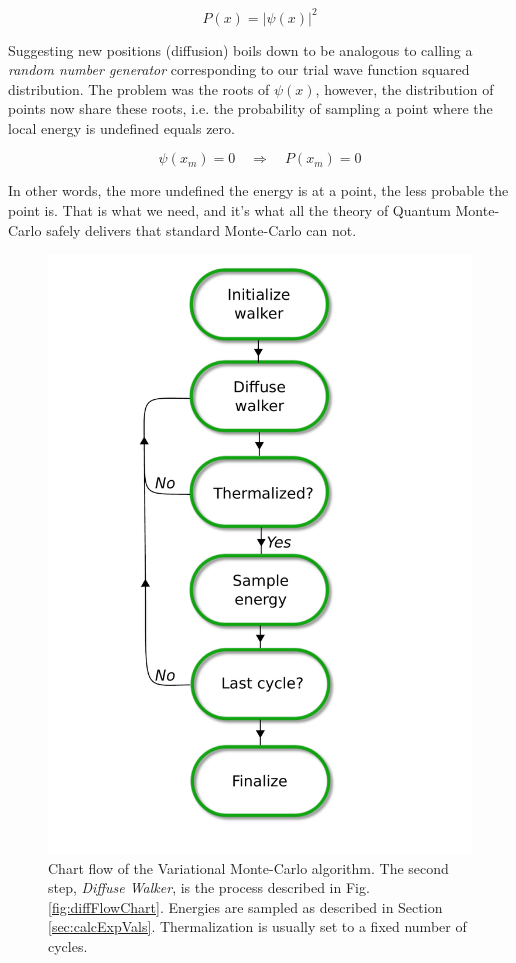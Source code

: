 \begin{equation*}
 P(x) = |\psi(x)|^2
\end{equation*}


Suggesting new positions (diffusion) boils down to be analogous to calling a \textit{random number generator} corresponding to our trial wave function squared distribution. The problem was the roots of $\psi(x)$, however, the distribution of points now share these roots, i.e. the probability of sampling a point where the local energy is undefined equals zero. 

\begin{equation}
 \psi(x_m) = 0 \quad\Longrightarrow\quad P(x_m) = 0
\end{equation}

In other words, the more undefined the energy is at a point, the less probable the point is. That is what we need, and it's what all the theory of Quantum Monte-Carlo safely delivers that standard Monte-Carlo can not. 

\begin{figure}
 \begin{center}
  \includegraphics[scale=0.65]{../Graphics/VMCUML.pdf}
  \caption{Chart flow of the Variational Monte-Carlo algorithm. The second step, \textit{Diffuse Walker}, is the process described in Fig. \ref{fig:diffFlowChart}. Energies are sampled as described in Section \ref{sec:calcExpVals}. Thermalization is usually set to a fixed number of cycles. }
  \label{fig:VMCchart}
 \end{center}
\end{figure}
\clearpage

